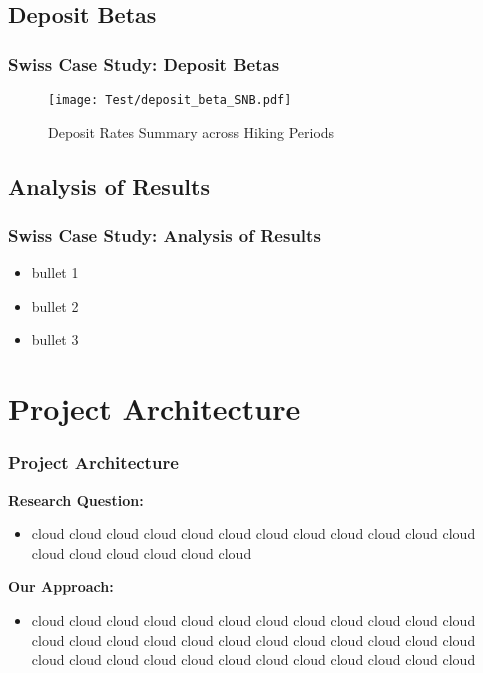 \documentclass{beamer}
\begin{document}
\subsection{Deposit Betas}
\begin{frame}
\frametitle{Swiss Case Study: Deposit Betas}
\begin{center}
\begin{minipage}{0.8\textwidth}
\begin{figure}[H]
    \texttt{[image: Test/deposit\_beta\_SNB.pdf]}
    \caption{Deposit Rates Summary across Hiking Periods}
    \label{fig:deposit_summary}
\end{figure}
\end{minipage}
\end{center}
\end{frame}

\subsection{Analysis of Results}
\begin{frame}
\frametitle{Swiss Case Study: Analysis of Results}
\begin{itemize}
    \item bullet 1
    \item bullet 2
    \item bullet 3
\end{itemize}
    
\end{frame}

\section{Project Architecture}
\begin{frame}
\frametitle{Project Architecture}
\textbf{Research Question:}
\begin{itemize}
  \item cloud cloud cloud cloud cloud cloud cloud cloud cloud cloud cloud cloud cloud cloud cloud cloud cloud cloud
\end{itemize}

\textbf{Our Approach:}
\begin{itemize}
  \item cloud cloud cloud cloud cloud cloud cloud cloud cloud cloud cloud cloud cloud cloud cloud cloud cloud cloud cloud cloud cloud cloud cloud cloud cloud cloud cloud cloud cloud cloud cloud cloud cloud cloud cloud cloud
\end{itemize}
\end{frame}
\end{document}
